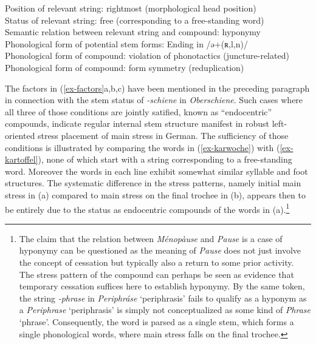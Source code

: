 \documentclass[output=paper
 ,nobabel
 ,draftmode
 ,colorlinks, citecolor=brown
]{langscibook}
\begin{document}
\eal\label{ex-factors}

\ex\label{ex-rightmost} 
Position of relevant string: rightmost (morphological head position)\\
     
\ex\label{ex-hyponymy}
Status of relevant string: free (corresponding to a free-standing word)\\
  
\ex\label{ex-free-bound}  
Semantic relation between relevant string and compound: hyponymy\\

\ex\label{ex-stem-end}
Phonological form of potential stem forms: Ending in /ə+({ʀ,l,n})/ \\

\ex\label{ex-phon-viol}
Phonological form of compound: violation of phonotactics (juncture-related) \\
 
\ex\label{ex-phon-rep}
Phonological form of compound: form symmetry (reduplication) \\
    
\zl

\noindent
The factors in (\ref{ex-factors}a,b,c) have been
mentioned in the preceding paragraph in connection with the stem status of \emph{-schiene} in {\it
  Oberschiene}. Such cases where all three of those conditions are jointly satified, known as
``endocentric'' compounds, indicate regular internal stem structure manifest in robust left\hyp
oriented stress placement of main stress in German. The sufficiency of
those conditions is illustrated by comparing the words in (\ref{ex-karwoche}) with
(\ref{ex-kartoffel}), none of which start with a string corresponding to a free-standing
word. Moreover the words in each line exhibit somewhat similar syllable and foot structures. The
systematic difference in the stress patterns, namely initial main stress in (a) compared to
main stress on the final trochee in (b), appears then to be entirely due to the status as
endocentric compounds of the words in (a).\footnote{The claim that the relation between
  \emph{Ménopàuse} and \emph{Pause} is a case of hyponymy can be questioned as the meaning of
  \emph{Pause} does not just involve the concept of cessation but typically also a return to some
  prior activity. The stress pattern of the compound can perhaps be seen as evidence that temporary
  cessation suffices here to establish hyponymy. By the same token, the string \emph{-phrase} in
  \emph{Periphráse} `periphrasis' fails to qualify as a hyponym as a \emph{Periphrase} `periphrasis'
  is simply not conceptualized as some kind of \emph{Phrase} `phrase'. Consequently, the word is
  parsed as a single stem, which forms a single phonological words, where main stress falls on the
  final trochee.} 
\end{document}
